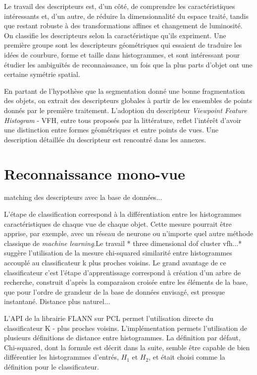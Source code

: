 Le travail des descripteurs est, d'un côté, de comprendre les
caractéristiques intéressants et, d'un autre, de réduire la
dimensionnalité du espace traité, tandis que restant robuste à des
transformations affines et changement de luminosité. On classifie les
descripteurs selon la caractéristique qu'ils expriment. Une première
groupe sont les descripteurs géométriques qui essaient de traduire les
idées de courbure, forme et taille dans histogrammes, et sont intéressant
pour étudier les ambiguïtés de reconnaissance, un fois que la plus parts 
d'objet ont une certaine symétrie spatial.


En partant de l'hypothèse que la segmentation donné une bonne fragmentation des objets, on extrait des descripteurs globales à partir de les ensembles de points donnés par le première traitement. L'adoption du descripteur \textit{Viewpoint Feature Histogram} - VFH, entre tous proposés par la littérature, reflet l'intérêt d'avoir une distinction entre formes géométriques et entre points de vues. Une description détaillée du descripteur est rencontré dans les annexes.  

\section {Reconnaissance mono-vue} 

matching des descripteurs avec la base de données...

L'étape de classification correspond à la différentiation entre les
histogrammes caractéristiques de chaque vue de chaque objet. Cette
mesure pourrait être apprise, par exemple, avec un réseau de neurone
ou n'importe quel autre méthode classique de \textit{machine learning}.{\color{green}Le travail * three dimensional
  dof cluster vfh...* suggère l'utilisation de la mesure chi-squared
  similarité entre histogrammes accouplé au classificateur k plus
  proches voisins. }  Le grand avantage de ce classificateur c'est l'étape
d’apprentissage correspond à création d’un arbre de recherche,
construit d'après la comparaison croisée entre les éléments de la base,
que pour l'ordre de grandeur de la base de données envisagé, est
presque instantané. Distance plus naturel...

L'API de la librairie FLANN sur PCL permet l'utilisation directe du classificateur
K - plus proches voisins. L'implémentation permets l'utilisation de plusieurs
définitions de distance entre histogrammes. La définition par défaut, Chi-squared,
dont la formule est décrit dans la suite, semble être capable de bien différentier
les histogrammes d'entrés, $H_1$ et $H_2$, et était choisi comme la définition pour le classificateur.

